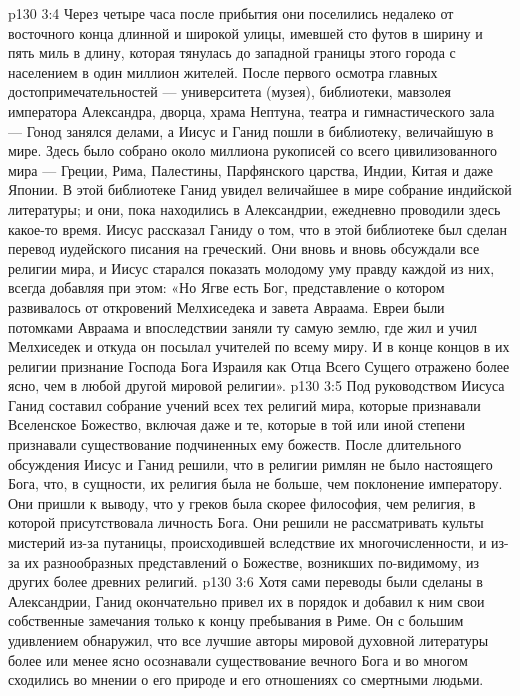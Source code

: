 \vs p130 3:4 \pc Через четыре часа после прибытия они поселились недалеко от восточного конца длинной и широкой улицы, имевшей сто футов в ширину и пять миль в длину, которая тянулась до западной границы этого города с населением в один миллион жителей. После первого осмотра главных достопримечательностей --- университета (музея), библиотеки, мавзолея императора Александра, дворца, храма Нептуна, театра и гимнастического зала --- Гонод занялся делами, а Иисус и Ганид пошли в библиотеку, величайшую в мире. Здесь было собрано около миллиона рукописей со всего цивилизованного мира --- Греции, Рима, Палестины, Парфянского царства, Индии, Китая и даже Японии. В этой библиотеке Ганид увидел величайшее в мире собрание индийской литературы; и они, пока находились в Александрии, ежедневно проводили здесь какое\hyp{}то время. Иисус рассказал Ганиду о том, что в этой библиотеке был сделан перевод иудейского писания на греческий. Они вновь и вновь обсуждали все религии мира, и Иисус старался показать молодому уму правду каждой из них, всегда добавляя при этом: «Но Ягве есть Бог, представление о котором развивалось от откровений Мелхиседека и завета Авраама. Евреи были потомками Авраама и впоследствии заняли ту самую землю, где жил и учил Мелхиседек и откуда он посылал учителей по всему миру. И в конце концов в их религии признание Господа Бога Израиля как Отца Всего Сущего отражено более ясно, чем в любой другой мировой религии».
\vs p130 3:5 \pc Под руководством Иисуса Ганид составил собрание учений всех тех религий мира, которые признавали Вселенское Божество, включая даже и те, которые в той или иной степени признавали существование подчиненных ему божеств. После длительного обсуждения Иисус и Ганид решили, что в религии римлян не было настоящего Бога, что, в сущности, их религия была не больше, чем поклонение императору. Они пришли к выводу, что у греков была скорее философия, чем религия, в которой присутствовала личность Бога. Они решили не рассматривать культы мистерий из\hyp{}за путаницы, происходившей вследствие их многочисленности, и из\hyp{}за их разнообразных представлений о Божестве, возникших по\hyp{}видимому, из других более древних религий.
\vs p130 3:6 Хотя сами переводы были сделаны в Александрии, Ганид окончательно привел их в порядок и добавил к ним свои собственные замечания только к концу пребывания в Риме. Он с большим удивлением обнаружил, что все лучшие авторы мировой духовной литературы более или менее ясно осознавали существование вечного Бога и во многом сходились во мнении о его природе и его отношениях со смертными людьми.
